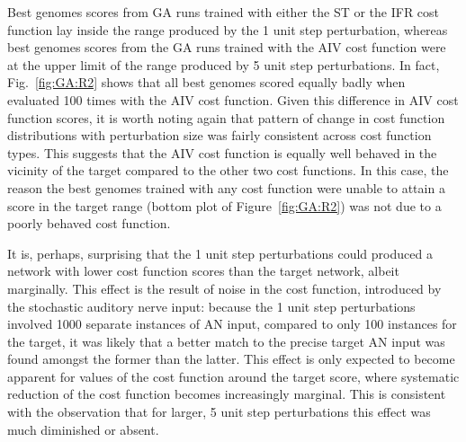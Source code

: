 
\smallskip{}

Best genomes scores from GA runs trained with either the ST or the IFR cost
function lay inside the range produced by the 1 unit step perturbation, whereas
best genomes scores from the GA runs trained with the AIV cost function were at
the upper limit of the range produced by 5 unit step perturbations. In fact,
Fig.~\ref{fig:GA:R2} shows that all best genomes scored equally badly when
evaluated 100 times with the AIV cost function. Given this difference in AIV
cost function scores, it is worth noting again that pattern of change in cost
function distributions with perturbation size was fairly consistent across cost
function types. This suggests that the AIV cost function is equally well behaved
in the vicinity of the target compared to the other two cost functions. In this
case, the reason the best genomes trained with any cost function were unable to
attain a score in the target range (bottom plot of Figure~\ref{fig:GA:R2}) was not
due to a poorly behaved cost function. 


\smallskip{}

It is, perhaps, surprising that the 1 unit step perturbations could produced a
network with lower cost function scores than the target network, albeit
marginally. This effect is the result of noise in the cost function, introduced
by the stochastic auditory nerve input: because the 1 unit step perturbations
involved 1000 separate instances of AN input, compared to only 100 instances for
the target, it was likely that a better match to the precise target AN input was
found amongst the former than the latter.  This effect is only expected to
become apparent for values of the cost function around the target score, where
systematic reduction of the cost function becomes increasingly marginal. This is
consistent with the observation that for larger, 5 unit step perturbations this
effect was much diminished or absent.


